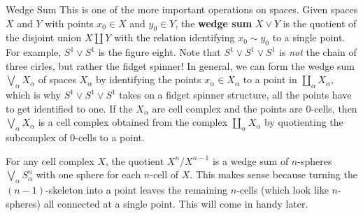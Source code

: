 \begin{namedthing}{Wedge Sum}
    This is one of the more important operations on spaces. Given spaces $X$ and $Y$ with points $x_0\in X$ and $y_0\in Y$, the \textbf{wedge sum} $X\vee Y$ is the quotient of the disjoint union $X\amalg Y$ with the relation identifying $x_0\sim y_0$ to a single point. For example, $S^1 \vee S^1 $ is the figure eight. Note that $S^1 \vee S^1 \vee S^1 $ is \emph{not} the chain of three cirles, but rather the fidget spinner! In general, we can form the wedge sum $\bigvee_{\alpha }X_{\alpha }$ of spaces $X_{\alpha }$ by identifying the points $x_{\alpha }\in X_{\alpha }$ to a point in $\amalg_{\alpha }X_{\alpha }$, which is why $S^1 \vee S^1 \vee S^1 $ takes on a fidget spinner structure, all the points have to get identified to one. If the $X_{\alpha }$ are cell complex and the points are $0$-cells, then $\bigvee_{\alpha }X_{\alpha }$ is a cell complex obtained from the complex $\amalg_{\alpha }X_{\alpha }$ by quotienting the subcomplex of $0$-cells to a point. 

    For any cell complex $X$, the quotient $X^n  /X^{n-1}$ is a wedge sum of $n$-spheres $\bigvee _{\alpha }S_{\alpha }^n $ with one sphere for each $n$-cell of $X$. This makes sense because turning the $(n-1)$-skeleton into a point leaves the remaining $n$-cells (which look like $n$-spheres) all connected at a single point. This will come in handy later.
\end{namedthing}
